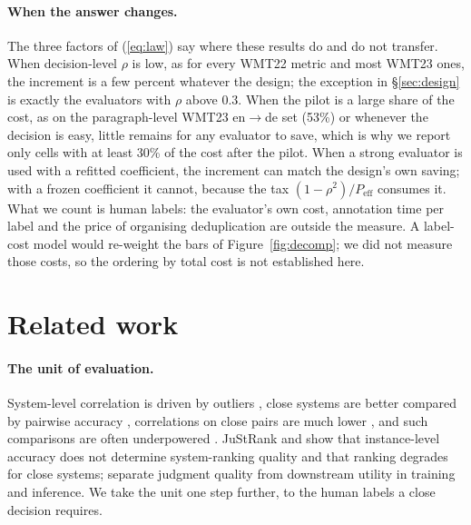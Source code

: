 \documentclass[11pt]{article}
\begin{document}
\paragraph{When the answer changes.} The three factors of (\ref{eq:law}) say where these results do and do not
transfer. When decision-level $\rho$ is low, as for every WMT22 metric and most WMT23 ones, the increment is a few
percent whatever the design; the exception in \S\ref{sec:design} is exactly the evaluators with $\rho$ above 0.3.
When the pilot is a large share of the cost, as on the paragraph-level WMT23 en$\to$de set (53\%) or whenever the
decision is easy, little remains for any evaluator to save, which is why we report only cells with at least 30\% of
the cost after the pilot. When a strong evaluator is used with a refitted coefficient, the increment can match the
design's own saving; with a frozen coefficient it cannot, because the tax $(1-\rho^2)/P_{\mathrm{eff}}$ consumes it.
What we count is human labels: the evaluator's own cost, annotation time per label and the price of organising
deduplication are outside the measure. A label-cost model would re-weight the bars of Figure~\ref{fig:decomp}; we
did not measure those costs, so the ordering by total cost is not established here.

\section{Related work}\label{sec:related}
\paragraph{The unit of evaluation.} System-level correlation is driven by outliers \citep{mathur2020tangled}, close
systems are better compared by pairwise accuracy \citep{kocmi2021ship,deutsch2023ties}, correlations on close pairs are
much lower \citep{deutsch2022reexamining}, and such comparisons are often underpowered \citep{card2020little}. JuStRank
\citep{gera2025justrank} and \citet{gao2025reeval} show that instance-level accuracy does not determine system-ranking
quality and that ranking degrades for close systems; \citet{zhang2026utility} separate judgment quality from downstream
utility in training and inference. We take the unit one step further, to the human labels a close decision requires.
\end{document}
